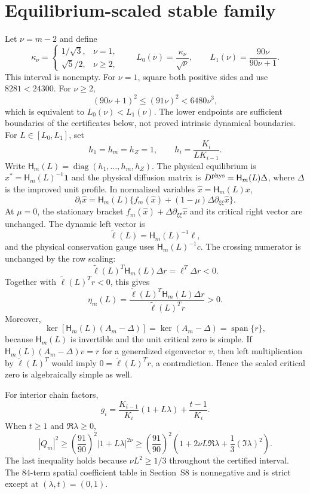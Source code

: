\documentclass[10pt]{article}
\newcommand{\diag}{\operatorname{diag}}
\newcommand{\1}{\mathbf1}
\begin{document}
\section{Equilibrium-scaled stable family}

Let $\nu=m-2$ and define
\[
 \kappa_\nu=\begin{cases}
 1/\sqrt3,&\nu=1,\\
 \sqrt5/2,&\nu\ge2,
 \end{cases}
 \qquad
 L_0(\nu)=\frac{\kappa_\nu}{\sqrt\nu},
 \qquad
 L_1(\nu)=\frac{90\nu}{90\nu+1}.
\]
This interval is nonempty.  For $\nu=1$, square both positive sides and use
$8281<24300$.  For $\nu\ge2$,
\[
 (90\nu+1)^2\le(91\nu)^2<6480\nu^3,
\]
which is equivalent to $L_0(\nu)<L_1(\nu)$.  The lower endpoints are
sufficient boundaries of the certificates below, not proved intrinsic
dynamical boundaries.  For $L\in[L_0,L_1]$, set
\[
 h_1=h_m=h_Z=1,\qquad h_i=\frac{K_i}{LK_{i-1}}.
\]
Write $\mathsf H_m(L)=\diag(h_1,\ldots,h_m,h_Z)$.  The physical
equilibrium is $x^*=\mathsf H_m(L)^{-1}\1$ and the physical diffusion matrix
is $D^{\rm phys}=\mathsf H_m(L)\Delta$, where $\Delta$ is the improved unit
profile.  In normalized variables $\widehat x=\mathsf H_m(L)x$,
\[
 \partial_t\widehat x=\mathsf H_m(L)
 \{f_m(\widehat x)+(1-\mu)\Delta\partial_{\xi\xi}\widehat x\}.
\]
At $\mu=0$, the stationary bracket
$f_m(\widehat x)+\Delta\partial_{\xi\xi}\widehat x$ and its critical right
vector are unchanged.  The dynamic left vector is
\[
 \widetilde\ell(L)=\mathsf H_m(L)^{-1}\ell,
\]
and the physical conservation gauge uses $\mathsf H_m(L)^{-1}c$.
The crossing numerator is unchanged by the row scaling:
\[
 \widetilde\ell(L)^T\mathsf H_m(L)\Delta r
 =\ell^T\Delta r<0.
\]
Together with $\widetilde\ell(L)^Tr<0$, this gives
\[
 \eta_m(L)=
 \frac{\widetilde\ell(L)^T\mathsf H_m(L)\Delta r}
 {\widetilde\ell(L)^Tr}>0.
\]
Moreover,
\[
 \ker\!\left[\mathsf H_m(L)(A_m-\Delta)\right]
 =\ker(A_m-\Delta)=\operatorname{span}\{r\},
\]
because $\mathsf H_m(L)$ is invertible and the unit critical zero is simple.
If $\mathsf H_m(L)(A_m-\Delta)v=r$ for a generalized eigenvector $v$, then
left multiplication by $\widetilde\ell(L)^T$ would imply
$0=\widetilde\ell(L)^Tr$, a contradiction.  Hence the scaled critical
zero is algebraically simple as well.

For interior chain factors,
\[
 g_i=\frac{K_{i-1}}{K_i}(1+L\lambda)+\frac{t-1}{K_i}.
\]
When $t\ge1$ and $\Re\lambda\ge0$,
\[
 |Q_m|^2\ge\left(\frac{91}{90}\right)^2|1+L\lambda|^{2\nu}
 \ge\left(\frac{91}{90}\right)^2
 \left(1+2\nu L\Re\lambda+\frac13(\Im\lambda)^2\right).
\]
The last inequality holds because $\nu L^2\ge1/3$ throughout the certified
interval.  The 84-term spatial coefficient table in Section~S8 is
nonnegative and is strict except at $(\lambda,t)=(0,1)$.
\end{document}
